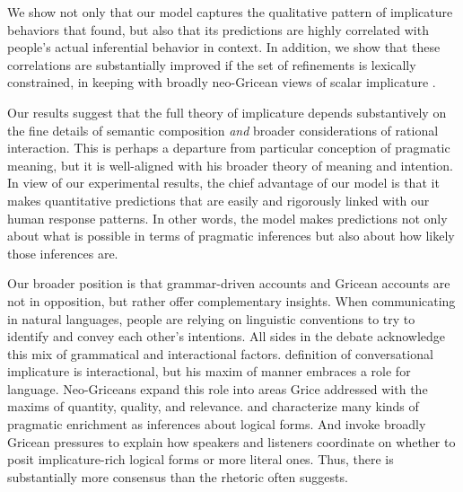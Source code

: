 \documentclass[leqno,12pt]{article}
\begin{document}
We show not only that our model captures the
qualitative pattern of implicature behaviors that
\citeauthor{Chemla:Spector:2011} found, but also that its predictions
are highly correlated with people's actual inferential behavior in
context. In addition, we show that these correlations are
substantially improved if the set of refinements is lexically
constrained, in keeping with broadly neo-Gricean views of scalar
implicature \citep{Horn72,Gazdar79b,Gazdar79a,SchulzVanRooij06}.

Our results suggest that the full theory of implicature depends
substantively on the fine details of semantic composition \emph{and} broader
considerations of rational interaction. This is perhaps a departure
from  particular conception of pragmatic meaning,
but it is well-aligned with his broader theory of meaning and
intention.  In view of our experimental results, the chief advantage
of our model is that it makes quantitative predictions that are
easily and rigorously linked with our human response patterns. In
other words, the model makes predictions not only about what is
possible in terms of pragmatic inferences but also about how likely
those inferences are. 




Our broader position is that grammar-driven accounts and Gricean accounts are
not in opposition, but rather offer complementary insights.  When
communicating in natural languages, people are relying on linguistic
conventions to try to identify and convey each other's intentions. All
sides in the debate acknowledge this mix of grammatical and
interactional factors.  definition of
conversational implicature is interactional, but his maxim of manner
embraces a role for language. Neo-Griceans expand this role into areas
Grice addressed with the maxims of quantity, quality, and
relevance. \citet{Sperber95} and \citet{Bach94} characterize many
kinds of pragmatic enrichment as inferences about logical forms. And
\citet{ChierchiaFoxSpector08} invoke broadly Gricean pressures to
explain how speakers and listeners coordinate on whether to posit
implicature-rich logical forms or more literal ones. Thus, there is
substantially more consensus than the rhetoric often suggests.




\end{document}

